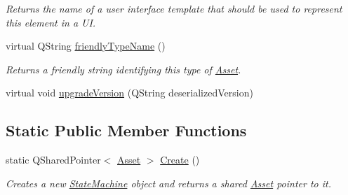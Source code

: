 \begin{DoxyCompactItemize}
\begin{DoxyCompactList}\small\item\em Returns the name of a user interface template that should be used to represent this element in a U\-I. \end{DoxyCompactList}\item 
virtual Q\-String \hyperlink{class_picto_1_1_state_machine_aaa9075f394c70230044f2051c6d04c38}{friendly\-Type\-Name} ()
\begin{DoxyCompactList}\small\item\em Returns a friendly string identifying this type of \hyperlink{class_picto_1_1_asset}{Asset}. \end{DoxyCompactList}\item 
virtual void \hyperlink{class_picto_1_1_state_machine_ab59beba932c283fa8dcb2c0f355542a7}{upgrade\-Version} (Q\-String deserialized\-Version)
\end{DoxyCompactItemize}
\subsection*{Static Public Member Functions}
\begin{DoxyCompactItemize}
\item 
\hypertarget{class_picto_1_1_state_machine_ac4b350f7cfca149e77e8b608f454a6ac}{static Q\-Shared\-Pointer$<$ \hyperlink{class_picto_1_1_asset}{Asset} $>$ \hyperlink{class_picto_1_1_state_machine_ac4b350f7cfca149e77e8b608f454a6ac}{Create} ()}\label{class_picto_1_1_state_machine_ac4b350f7cfca149e77e8b608f454a6ac}

\begin{DoxyCompactList}\small\item\em Creates a new \hyperlink{class_picto_1_1_state_machine}{State\-Machine} object and returns a shared \hyperlink{class_picto_1_1_asset}{Asset} pointer to it. \end{DoxyCompactList}\end{DoxyCompactItemize}

